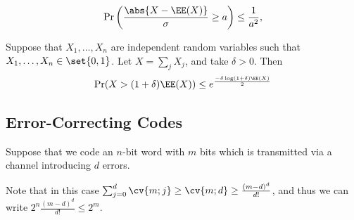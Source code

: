 \documentclass[11pt]{scrartcl}
\begin{document}
  \begin{theorem}
    
    \begin{equation*}
      \Pr\left(\frac{\abs{X-\EE(X)}}{\sigma} \geq a\right) \leq \frac{1}{a^{2}},
    \end{equation*}

  \end{theorem}

  \begin{theorem}
    Suppose that $X_{1}, \dots, X_{n}$ are independent random
    variables such that $X_{1}, \dots, X_{n} \in \set{0, 1}$. Let
    $X = \sum_{j} X_{j}$, and take $\delta > 0$. Then
    \begin{equation*}
      \Pr(X > (1+\delta) \EE(X)) \leq e^{\frac{-\delta \log(1+\delta)\EE(X)}{2}}
    \end{equation*}

  \end{theorem}

  \subsection{Error-Correcting Codes}

  Suppose that we code an $n$-bit word with $m$ bits which is
  transmitted via a channel introducing $d$ errors.

  Note that in this case
  $\sum_{j=0}^{d}\cv{m;j} \geq \cv{m;d} \geq \frac{(m-d)^{d}}{d!}$,
  and thus we can write $2^{n}\frac{(m-d)^{d}}{d!} \leq 2^{m}$.
\end{document}
